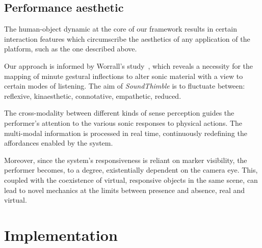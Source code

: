 \subsection{Performance aesthetic}
\label{sec:aesthetic}

The human-object dynamic at the core of our framework results in certain interaction features which circumscribe the aesthetics of any application of the platform, such as the one described above.

Our approach is informed by Worrall's study~\cite{worrall2013understanding}, which reveals a necessity for the mapping of minute gestural inflections to alter sonic material with a view to certain modes of listening. The aim of \textit{SoundThimble} is to fluctuate between: reflexive, kinaesthetic, connotative, empathetic, reduced.

The cross-modality between different kinds of sense perception guides the performer's attention to the various sonic responses to physical actions. The multi-modal information is processed in real time, continuously redefining the affordances enabled by the system.

Moreover, since the system's responsiveness is reliant on marker visibility, the performer becomes, to a degree, existentially dependent on the camera eye. This, coupled with the coexistence of virtual, responsive objects in the same scene, can lead to novel mechanics at the limits between presence and absence, real and virtual.

\section{Implementation}
\label{sec:implem}



